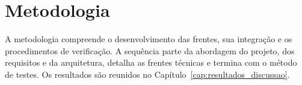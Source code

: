 \chapter{Metodologia}\label{cap:metodo_integrado}
A metodologia compreende o desenvolvimento das frentes, sua integração e os
procedimentos de verificação. A sequência parte da abordagem do projeto, dos
requisitos e da arquitetura, detalha as frentes técnicas e termina com o método de testes.
Os resultados são reunidos no Capítulo~\ref{cap:resultados_discussao}.

